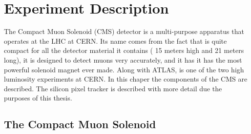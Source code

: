 \chapter{Experiment Description }

The Compact Muon Solenoid (CMS) detector is a multi-purpose apparatus that operates at the LHC at CERN. Its name comes from the fact that is quite compact for all the detector material it contains ( 15 meters high and 21 meters long), it is designed to detect muons very accurately, and it has it has the most powerful solenoid magnet ever made. Along with ATLAS, is one of the two high luminosity experiments at CERN. In this chaper the components of the CMS are described. The silicon pixel tracker is described with more detail due the purposes of this thesis. 

\section{The Compact Muon Solenoid}

